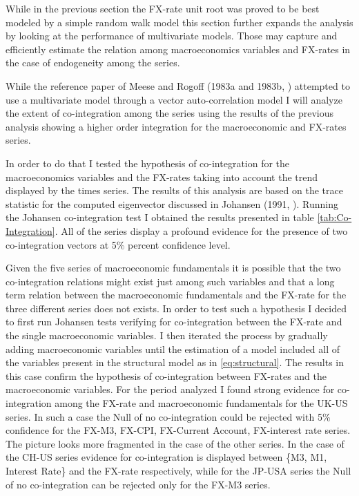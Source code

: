 While in the previous section the FX-rate unit root was proved to be
best modeled by a simple random walk model this section further
expands the analysis by looking at the performance of multivariate
models. Those may capture and efficiently estimate the relation among
macroeconomics variables and FX-rates in the case of endogeneity among
the series.

While the reference paper of Meese and Rogoff (1983a and 1983b,
\cite{MeeseRogoffa, MeeseRogoffb}) attempted to use a multivariate
model through a vector auto-correlation model I will analyze the
extent of co-integration among the series using the results of the
previous analysis showing a higher order integration for the
macroeconomic and FX-rates series.

In order to do that I tested the hypothesis of co-integration for the
macroeconomics variables and the FX-rates taking into account the
trend displayed by the times series. The results of this analysis are
based on the trace statistic for the computed eigenvector discussed in
Johansen (1991, \cite{Johansen}). Running the Johansen co-integration
test I obtained the results presented in table
\ref{tab:Co-Integration}. All of the series display a profound evidence
for the presence of two co-integration vectors at 5\% percent
confidence level.

Given the five series of macroeconomic fundamentals it is possible
that the two co-integration relations might exist just among such
variables and that a long term relation between the macroeconomic
fundamentals and the FX-rate for the three different series does not
exists. In order to test such a hypothesis I decided to first run
Johansen tests verifying for co-integration between the FX-rate and the
single macroeconomic variables. I then iterated the process by
gradually adding macroeconomic variables until the estimation of a
model included all of the variables present in the structural model as
in \ref{eq:structural}. The results in this case confirm the
hypothesis of co-integration between FX-rates and the macroeconomic
variables.  For the period analyzed I found strong evidence for
co-integration among the FX-rate and macroeconomic fundamentals for the
UK-US series. In such a case the Null of no co-integration could be
rejected with 5\% confidence for the FX-M3, FX-CPI, FX-Current
Account, FX-interest rate series.  The picture looks more fragmented
in the case of the other series. In the case of the CH-US series
evidence for co-integration is displayed between \{M3, M1, Interest
Rate\} and the FX-rate respectively, while for the JP-USA series the
Null of no co-integration can be rejected only for the FX-M3 series.

